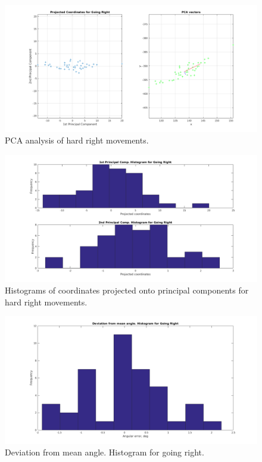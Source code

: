 \documentclass[paper=a4, fontsize=11pt]{scrartcl} %
\begin{document}
    \begin{figure}[h!]
        \begin{center}
            \setlength{\fboxsep}{0.5pt} %
            \setlength{\fboxrule}{0.5pt}
            \includegraphics[width=\linewidth,fbox]{images/pca_Right.png}
            \caption{PCA analysis of hard right movements.}
        \end{center}
    \end{figure}
    
    \begin{figure}[h!]
        \begin{center}
            \setlength{\fboxsep}{0.5pt} %
            \setlength{\fboxrule}{0.5pt}
            \includegraphics[width=\linewidth,fbox]{images/pca_histogram_Right.png}
            \caption{Histograms of coordinates projected onto principal components for hard right movements.}
        \end{center}
    \end{figure}

	\begin{figure}[h!]
		\begin{center}
			\setlength{\fboxsep}{0.5pt} %
			\setlength{\fboxrule}{0.5pt}
			\includegraphics[width=\linewidth,fbox]{images/histogram_5_phi_right.png}
			\caption{Deviation from mean angle. Histogram for going right.}
		\end{center}
	\end{figure}
\end{document}
